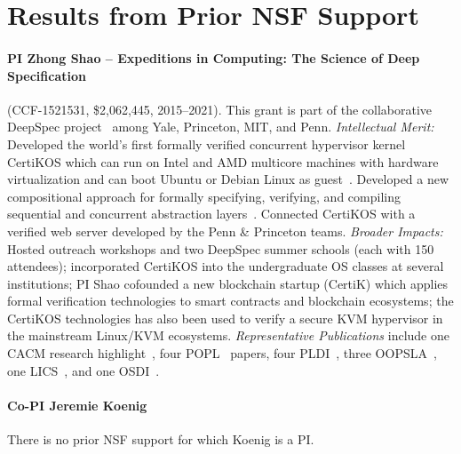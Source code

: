 \section{Results from Prior NSF Support}
\label{sec:prior}

\paragraph{PI Zhong Shao -- Expeditions in Computing: The Science of Deep Specification} (CCF-1521531, \$2,062,445, 2015--2021). 
This grant is part of the collaborative DeepSpec project~\cite{deepspec} among Yale, Princeton, MIT, and Penn. 
\emph{Intellectual Merit:} 
Developed the world's first formally verified
concurrent hypervisor kernel CertiKOS which can run on Intel and AMD
multicore machines with hardware virtualization and can boot Ubuntu or
Debian Linux as guest~\cite{certikos-osdi16}. Developed a
new compositional approach for formally specifying, verifying, and
compiling sequential and concurrent abstraction
layers~\cite{chen16,costanzo16,certikos-osdi16,ccal18,compcerto,wang2019,koenig20}.
Connected CertiKOS with a verified web server
developed by the Penn \& Princeton teams.
\emph{Broader Impacts:} 
Hosted outreach workshops and two DeepSpec summer schools (each with
150 attendees); incorporated CertiKOS into the undergraduate OS
classes at several institutions; PI Shao cofounded a new blockchain startup
(CertiK) which applies formal verification technologies to smart
contracts and blockchain ecosystems; the CertiKOS technologies has
also been used to verify a secure KVM hypervisor in the mainstream
Linux/KVM ecosystems.  {\em Representative Publications} include one
CACM research highlight~\cite{certikos-cacm19}, four
POPL~\cite{wang2019,liu-popl20,wang2022,layered22} papers, four
PLDI~\cite{chen16,costanzo16,ccal18,compcerto}, three
OOPSLA~\cite{deepsea19,compcertelf20,ado21}, one LICS~\cite{koenig20},
and one OSDI~\cite{certikos-osdi16}.

\vspace*{-1ex}
\paragraph{Co-PI Jeremie Koenig} 
There is no prior NSF support for which Koenig is a PI.

